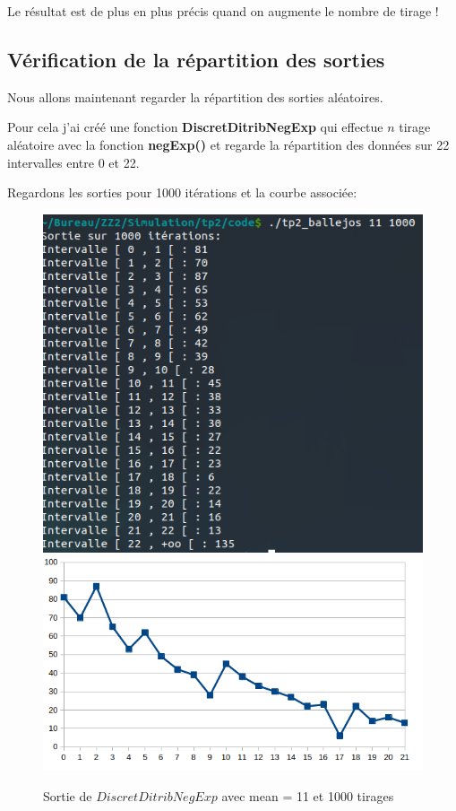 \documentclass[12pt,french]{article} %
\begin{document}
Le résultat est de plus en plus précis quand on augmente le nombre de tirage !

\subsection{Vérification de la répartition des sorties}

Nous allons maintenant regarder la répartition des sorties aléatoires.

Pour cela j'ai créé une fonction \textbf{DiscretDitribNegExp} qui effectue $n$ tirage aléatoire avec la fonction  \textbf{negExp()} et regarde la répartition des données sur 22 intervalles entre 0 et 22.

Regardons les sorties pour 1000 itérations et la courbe associée:

\begin{figure}[H]
	\centering
	\includegraphics[scale=0.4]{exo4-4.png}
	\includegraphics[scale=0.4]{exo4-3.png}
	\caption{Sortie de $DiscretDitribNegExp$ avec mean = 11 et 1000 tirages}    
\end{figure}
\end{document}
